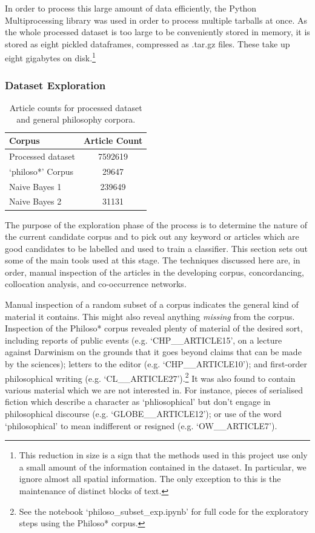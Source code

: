 \documentclass{article}
\begin{document}
In order to process this large amount of data efficiently, the Python Multiprocessing library was used in order to process multiple tarballs at once. As the whole processed dataset is too large to be conveniently stored in memory, it is stored as eight pickled dataframes, compressed as .tar.gz files. These take up eight gigabytes on disk.\footnote{This reduction in size is a sign that the methods used in this project use only a small amount of the information contained in the dataset. In particular, we ignore almost all spatial information. The only exception to this is the maintenance of distinct blocks of text.}

\subsubsection{Dataset Exploration}\label{s:explore}

\begin{table}[]
        \centering
        \begin{tabular}{l|c}
             Corpus &  Article Count \\
             \hline
          Processed dataset & 7592619 \\
          `philoso*' Corpus &	29647 \\
          Naive Bayes 1 &	239649 \\
          Naive Bayes 2 & 31131
        \end{tabular}
        \caption{Article counts for processed dataset and general philosophy corpora.}
        \label{t:corpus-sizes}
\end{table}

The purpose of the exploration phase of the process is to determine the nature of the current candidate corpus and to pick out any keyword or articles which are good candidates to be labelled and used to train a classifier. This section sets out some of the main tools used at this stage. The techniques discussed here are, in order, manual inspection of the articles in the developing corpus, concordancing, collocation analysis, and co-occurrence networks.

Manual inspection of a random subset of a corpus indicates the general kind of material it contains. This might also reveal anything \textit{missing} from the corpus. Inspection of the Philoso* corpus revealed plenty of material of the desired sort, including reports of public events (e.g. `CHP\_\_\-ARTICLE15', on a lecture against Darwinism on the grounds that it goes beyond claims that can be made by the sciences); letters to the editor (e.g. `CHP\_\_\-ARTICLE10'); and first-order philosophical writing (e.g. `CL\_\_\-ARTICLE27').\footnote{See the notebook `philoso\_\-subset\_\-exp.ipynb' for full code for the exploratory steps using the Philoso* corpus.} It was also found to contain various material which we are not interested in. For instance, pieces of serialised fiction which describe a character as `phliosophical' but don't engage in philosophical discourse (e.g. `GLOBE\_\_\-ARTICLE12'); or use of the word `philosophical' to mean indifferent or resigned (e.g. `OW\_\_\-ARTICLE7').
\end{document}
